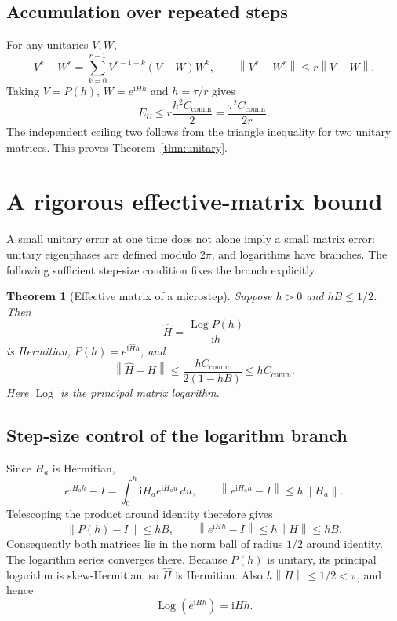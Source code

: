 \documentclass[11pt,a4paper]{article}
\newcommand{\norm}[1]{\left\lVert #1\right\rVert}
\newcommand{\ii}{\mathrm{i}}
\newcommand{\CC}{C_{\mathrm{comm}}}
\newtheorem{theorem}{Theorem}
\begin{document}
\subsection{Accumulation over repeated steps}
For any unitaries $V,W$,
\begin{equation}
 V^r-W^r=\sum_{k=0}^{r-1}V^{r-1-k}(V-W)W^k,
 \qquad \norm{V^r-W^r}\leq r\norm{V-W}.
\end{equation}
Taking $V=P(h)$, $W=e^{\ii Hh}$ and $h=\tau/r$ gives
\begin{equation}
 E_U\leq r\frac{h^2\CC}{2}=\frac{\tau^2\CC}{2r}.
\end{equation}
The independent ceiling two follows from the triangle inequality for two unitary matrices. This proves Theorem~\ref{thm:unitary}.

\section{A rigorous effective-matrix bound}
A small unitary error at one time does not alone imply a small matrix error: unitary eigenphases are defined modulo $2\pi$, and logarithms have branches. The following sufficient step-size condition fixes the branch explicitly.

\begin{theorem}[Effective matrix of a microstep]\label{thm:matrix}
Suppose $h>0$ and $hB\leq1/2$. Then
\begin{equation}
 \widehat H=\frac{\operatorname{Log}P(h)}{\ii h}
\end{equation}
is Hermitian, $P(h)=e^{\ii\widehat Hh}$, and
\begin{equation}\label{eq:matrix}
 \boxed{\norm{\widehat H-H}
 \leq\frac{h\CC}{2(1-hB)}\leq h\CC.}
\end{equation}
Here $\operatorname{Log}$ is the principal matrix logarithm.
\end{theorem}

\subsection{Step-size control of the logarithm branch}
Since $H_a$ is Hermitian,
\begin{equation}
 e^{\ii H_ah}-I=\int_0^h\ii H_a e^{\ii H_au}\,du,
 \qquad\norm{e^{\ii H_ah}-I}\leq h\norm{H_a}.
\end{equation}
Telescoping the product around identity therefore gives
\begin{equation}\label{eq:nearidentity}
 \norm{P(h)-I}\leq hB,\qquad
 \norm{e^{\ii Hh}-I}\leq h\norm H\leq hB.
\end{equation}
Consequently both matrices lie in the norm ball of radius $1/2$ around identity. The logarithm series converges there. Because $P(h)$ is unitary, its principal logarithm is skew-Hermitian, so $\widehat H$ is Hermitian. Also $h\norm H\leq1/2<\pi$, and hence
\begin{equation}
 \operatorname{Log}(e^{\ii Hh})=\ii Hh.
\end{equation}
\end{document}
